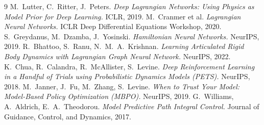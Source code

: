 \documentclass[11pt]{article}
\begin{document}
\begin{thebibliography}{9}
 M.~Lutter, C.~Ritter, J.~Peters.
  \emph{Deep Lagrangian Networks: Using Physics as Model Prior for Deep
  Learning.} ICLR, 2019.
 M.~Cranmer et al.
  \emph{Lagrangian Neural Networks.} ICLR Deep Differential Equations
  Workshop, 2020.
 S.~Greydanus, M.~Dzamba, J.~Yosinski.
  \emph{Hamiltonian Neural Networks.} NeurIPS, 2019.
 R.~Bhattoo, S.~Ranu, N.~M.~A.~Krishnan.
  \emph{Learning Articulated Rigid Body Dynamics with Lagrangian Graph Neural
  Network.} NeurIPS, 2022.
 K.~Chua, R.~Calandra, R.~McAllister, S.~Levine.
  \emph{Deep Reinforcement Learning in a Handful of Trials using Probabilistic
  Dynamics Models (PETS).} NeurIPS, 2018.
 M.~Janner, J.~Fu, M.~Zhang, S.~Levine.
  \emph{When to Trust Your Model: Model-Based Policy Optimization (MBPO).}
  NeurIPS, 2019.
 G.~Williams, A.~Aldrich, E.~A.~Theodorou.
  \emph{Model Predictive Path Integral Control.} Journal of Guidance, Control,
  and Dynamics, 2017.
\end{thebibliography}
\end{document}
